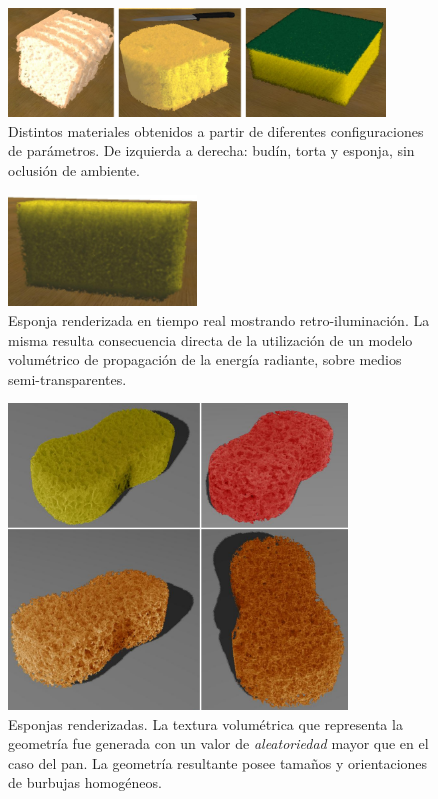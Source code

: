 \begin{figure}[htb!]
  \centerline{\includegraphics[width=10cm]{figures/fig6}}
  \caption[Budín, torta y esponja renderizados]{Distintos materiales obtenidos a partir de diferentes configuraciones de parámetros. De izquierda a derecha: budín, torta y esponja, sin oclusión de ambiente. }
  \label{fg:fig6}

\end{figure}

\begin{figure}[htb!]
  \centerline{\includegraphics[width=5cm]{figures/fig7}}
  \caption[Esponja retro-iluminada.]{Esponja renderizada en tiempo real mostrando retro-iluminación. La misma resulta consecuencia directa de la utilización de un modelo volumétrico de propagación de la energía radiante, sobre medios semi-transparentes.}
  \label{fg:fig7}
\end{figure}


\begin{figure}
  \centerline{\includegraphics[width=9cm]{figures/Fig13CAVW}}
  \caption[Esponjas renderizadas]{Esponjas renderizadas. La textura volumétrica que representa la geometría fue generada con un valor de {\em aleatoriedad} mayor que en el caso del pan. La geometría resultante posee tamaños y orientaciones de burbujas homogéneos.}
  \label{fg:sponges}
\end{figure}


